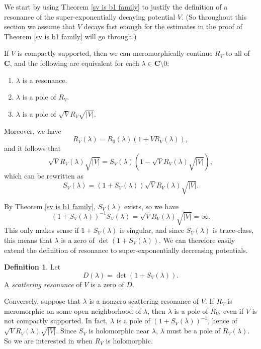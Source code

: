 \documentclass[12pt]{report}
\newcommand{\CC}{\mathbf{C}}
\newcommand{\dfn}[1]{\emph{#1}\index{#1}}
\theoremstyle{definition}
\newtheorem{definition}[theorem]{Definition}
\begin{document}
We start by using Theorem \ref{sv is b1 family} to justify the definition of a resonance of the super-exponentially decaying potential $V$. (So throughout this section we assume that $V$ decays fast enough for the estimates in the proof of Theorem \ref{sv is b1 family} will go through.)

If $V$ is compactly supported, then we can meromorphically continue $R_V$ to all of $\CC$, and the following are equivalent for each $\lambda \in \CC \setminus 0$:
\begin{enumerate}
\item $\lambda$ is a resonance.
\item $\lambda$ is a pole of $R_V$.
\item $\lambda$ is a pole of $\sqrt VR_V\sqrt{|V|}$.
\end{enumerate}
Moreover, we have
$$R_V(\lambda) = R_0(\lambda)(1 + VR_V(\lambda)),$$
and it follows that
$$\sqrt V R_V(\lambda) \sqrt{|V|} = S_V(\lambda)(1 - \sqrt VR_V(\lambda)\sqrt{|V|}),$$
which can be rewritten as
$$S_V(\lambda) = (1 + S_V(\lambda))\sqrt V R_V(\lambda)\sqrt{|V|}.$$

By Theorem \ref{sv is b1 family}, $S_V(\lambda)$ exists, so we have
$$(1 + S_V(\lambda))^{-1}S_V(\lambda) = \sqrt V R_V(\lambda) \sqrt{|V|} = \infty.$$
This only makes sense if $1 + S_V(\lambda)$ is singular, and since $S_V(\lambda)$ is trace-class, this means that $\lambda$ is a zero of $\det(1 + S_V(\lambda))$.
We can therefore easily extend the definition of resonance to super-exponentially decreasing potentials.
\begin{definition}
\label{determinant definition of resonance}
Let
$$D(\lambda) = \det(1 + S_V(\lambda)).$$
A \dfn{scattering resonance} of $V$ is a zero of $D$.
\end{definition}

Conversely, suppose that $\lambda$ is a nonzero scattering resonance of $V$. If $R_V$ is meromorphic on some open neighborhood of $\lambda$, then $\lambda$ is a pole of $R_V$, even if $V$ is not compactly supported. In fact, $\lambda$ is a pole of $(1 + S_V(\lambda))^{-1}$, hence of $\sqrt VR_V(\lambda) \sqrt{|V|}$. Since $S_V$ is holomorphic near $\lambda$, $\lambda$ must be a pole of $R_V(\lambda)$. So we are interested in when $R_V$ is holomorphic.
\end{document}
